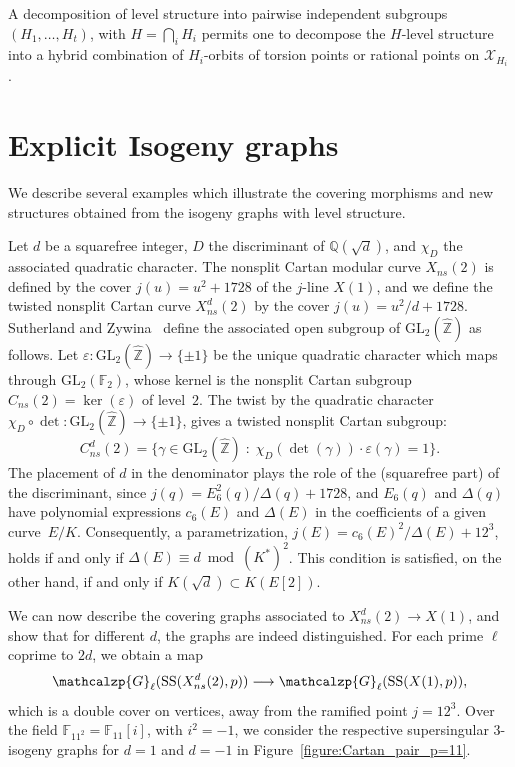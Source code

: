 \documentclass{amsart}
\newcommand{\cX}{\mathcal{X}}
\newcommand{\FF}{\mathbb{F}}
\newcommand{\QQ}{\mathbb{Q}}
\newcommand{\ZZ}{\mathbb{Z}}
\newcommand{\ZZhat}{\widehat{\ZZ}}
\newcommand{\GL}{\mathrm{GL}}
\renewcommand{\SS}{\mathrm{SS}}
\newcommand{\Graph}{\mathcalzp{G}}
\renewcommand{\SS}{\mathrm{SS}}
\begin{document}
A decomposition of level structure into pairwise independent subgroups $(H_1,\dots,H_t)$,
with $H = \bigcap_i H_i$ permits one to decompose the $H$-level structure into a hybrid
combination of $H_i$-orbits of torsion points or rational points on $\cX_{H_i}$.
\bigskip


\section{Explicit Isogeny graphs}

We describe several examples which illustrate the covering morphisms and new structures
obtained from the isogeny graphs with level structure.
\medskip

Let $d$ be a squarefree integer, $D$ the discriminant of $\QQ(\sqrt{d})$,
and $\chi_D$ the associated quadratic character. The nonsplit Cartan modular
curve $X_{ns}(2)$ is defined by the cover $j(u) = u^2 + 1728$ of the
$j$-line $X(1)$, and we define the twisted nonsplit Cartan curve
$X_{ns}^d(2)$ by the cover $j(u) = u^2/d + 1728$.
Sutherland and Zywina~\cite[Remark~3.4]{SutherlandZywina} define the
associated open subgroup of $\GL_2(\ZZhat)$ as follows.
Let $\varepsilon: \GL_2(\ZZhat) \to \{\pm1\}$ be the unique quadratic
character which maps through $\GL_2(\FF_2)$, whose kernel is the
nonsplit Cartan subgroup $C_{ns}(2) = \ker(\varepsilon)$ of level~$2$.
The twist by the quadratic character $\chi_D \circ \det: \GL_2(\ZZhat)
\to \{\pm1\}$, gives a twisted nonsplit Cartan subgroup:
$$
C_{ns}^d(2) = \{ \gamma \in \GL_2(\ZZhat) \;:\; \chi_D(\det(\gamma)) \cdot \varepsilon(\gamma) = 1\}.
$$
The placement of $d$ in the denominator plays the role of the
(squarefree part) of the discriminant, since $j(q) = {E_6^2(q)}/{\Delta(q)} + 1728$,
and $E_6(q)$ and $\Delta(q)$ have polynomial expressions $c_6(E)$ and
$\Delta(E)$ in the coefficients of a given curve~$E/K$.
Consequently, a parametrization, $j(E) = c_6(E)^2/\Delta(E) + 12^3$, holds
if and only if $\Delta(E) \equiv d \bmod (K^*)^2$.  This condition is
satisfied, on the other hand, if and only if $K(\sqrt{d}) \subset K(E[2])$.

We can now describe the covering graphs associated to $X_{ns}^d(2) \to X(1)$,
and show that for different $d$, the graphs are indeed distinguished.
For each prime $\ell$ coprime to $2d$, we obtain a map
$$
\Graph_\ell(\SS(X_{ns}^{d}(2),p)) \longrightarrow \Graph_\ell(\SS(X(1),p)),
$$
which is a double cover on vertices, away from the ramified point
$j = 12^3$.  Over the field $\FF_{11^2} = \FF_{11}[i]$, with $i^2 = -1$,
we consider the respective supersingular $3$-isogeny graphs for $d = 1$
and $d = -1$ in Figure~\ref{figure:Cartan_pair_p=11}.
\end{document}
